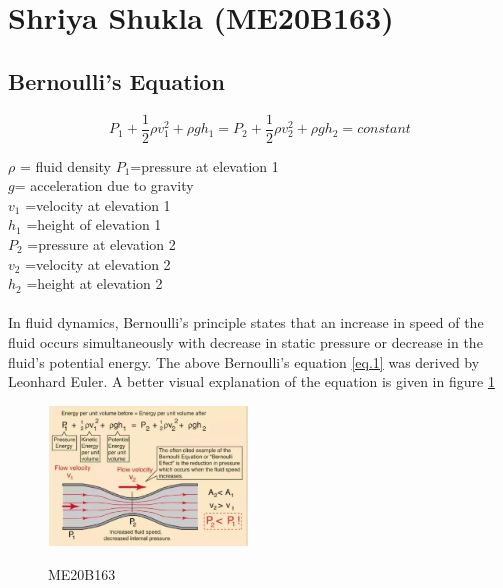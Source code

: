 %
\section{Shriya Shukla (ME20B163)}
\subsection{Bernoulli's Equation} \cite{bernoullieq}
\begin{equation}
P_{1}+\frac{1}{2}\rho v_{1}^{2}+\rho g h_{1}=P_{2}+\frac{1}{2}\rho v_{2}^{2}+\rho g h_{2}=constant \label{eq.1} 
\end{equation}

\begin{flushleft}
$\rho$ = fluid density \newline
$P_{1}$=pressure at elevation 1 \\
$g$= acceleration due to gravity \\
$v_{1}$	=velocity at elevation 1 \\
$h_{1}$	=height of elevation 1 \\
$P_{2}$	=pressure at elevation 2 \\
$v_{2}$	=velocity at elevation 2 \\
$h_{2}$	=height at elevation 2 \\

\end{flushleft}
\paragraph{}
In fluid dynamics, Bernoulli's principle states that an increase in speed of the fluid occurs simultaneously with decrease in static pressure or decrease in the fluid's potential energy. The above Bernoulli's equation \ref{eq.1} was derived by Leonhard Euler. A better visual explanation of the equation is given in figure \ref{fig:bernoulli}
\begin{figure}[h]
\begin{center}

\includegraphics[width=200px]{me20b163/ME20B163.eps} 
\caption{ME20B163}\cite{ME20B163}
\label{fig:bernoulli}		
		 
\end{center}
\end{figure}

%
%

%